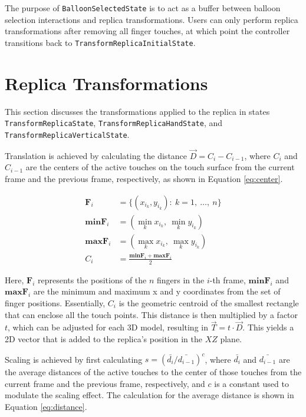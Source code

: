     The purpose of \lstinline{BalloonSelectedState} is to act as a buffer between balloon selection interactions and replica transformations. Users can only perform replica transformations after removing all finger touches, at which point the controller transitions back to \lstinline{TransformReplicaInitialState}.


\section{Replica Transformations} \label{sec:transformation}

    This section discusses the transformations applied to the replica in states \lstinline{TransformReplicaState}, \lstinline{TransformReplicaHandState}, and \lstinline{TransformReplicaVerticalState}.
    
    Translation is achieved by calculating the distance \(\vec{D} = C_{i} - C_{i-1}\), where \(C_{i}\) and \(C_{i-1}\) are the centers of the active touches on the touch surface from the current frame and the previous frame, respectively, as shown in Equation \ref{eq:center}.

    \begin{figure}[h]
    \begin{equation}
    \begin{split} \label{eq:center}
        \mathbf{F}_i &= \{(x_{i_k}, y_{i_k}) :\ k = 1,\ \dots,\ n\} \\
        \mathbf{minF}_i &= (\min_{k} x_{i_k},\ \min_{k} y_{i_k}) \\
        \mathbf{maxF}_i &= (\max_{k} x_{i_k},\ \max_{k} y_{i_k}) \\
        C_i &= \frac{\mathbf{minF}_i + \mathbf{maxF}_i}{2}
    \end{split}
    \end{equation}
    \end{figure}

    Here, \(\mathbf{F}_i\) represents the positions of the \(n\) fingers in the \(i\)-th frame, \(\mathbf{minF}_i\) and \(\mathbf{maxF}_i\) are the minimum and maximum x and y coordinates from the set of finger positions. Essentially, \(C_i\) is the geometric centroid of the smallest rectangle that can enclose all the touch points. This distance is then multiplied by a factor \(t\), which can be adjusted for each 3D model, resulting in \(\vec{T} = t \cdot \vec{D}\). This yields a 2D vector that is added to the replica's position in the \(XZ\) plane.

    Scaling is achieved by first calculating $s = {{\left(\bar{d_i} / \bar{d_{i-1}}\right)}^{c}}$, where \(\bar{d_i}\) and \(\bar{d_{i-1}}\) are the average distances of the active touches to the center of those touches from the current frame and the previous frame, respectively, and \(c\) is a constant used to modulate the scaling effect. The calculation for the average distance is shown in Equation \ref{eq:distance}.
    
